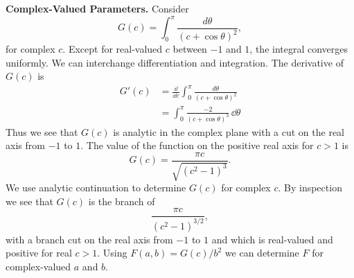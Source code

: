 {\begin{Solution}
  \textbf{Complex-Valued Parameters.}
  Consider
  \[
  G(c) = \int_0^\pi \frac{ d \theta }{ (c + \cos \theta)^2 },
  \]
  for complex $c$.  
  Except for real-valued $c$ between $-1$ and $1$, the integral converges
  uniformly.  We can interchange differentiation and integration.
  The derivative of $G(c)$ is
  \begin{align*}
    G'(c)   &= \frac{\dd}{\dd c} \int_0^\pi \frac{ d \theta }{ (c + \cos \theta)^2 } \\
    &= \int_0^\pi \frac{ -2 }{ (c + \cos \theta)^3 } \,\dd \theta 
  \end{align*}
  Thus we see that $G(c)$ is analytic in the complex plane with a cut
  on the real axis from $-1$ to $1$.  The value of the function on 
  the positive real axis for $c > 1$ is 
  \[
  G(c) = \frac{ \pi c }{ \sqrt{(c^2 - 1)^3} }.
  \]
  We use analytic continuation to determine $G(c)$ for complex $c$.  By 
  inspection we see that $G(c)$ is the branch of 
  \[
  \frac{ \pi c }{ (c^2 - 1)^{3/2} },
  \]
  with a branch cut on the real axis from $-1$ to $1$ and which is 
  real-valued and positive for real $c > 1$.
  Using $F(a,b) = G(c) / b^2$ we can determine $F$ for complex-valued 
  $a$ and $b$.
\end{Solution}







}
